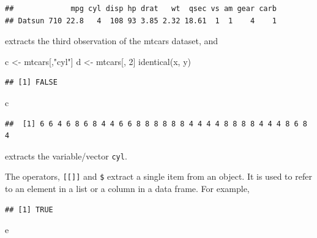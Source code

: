 \documentclass[
  12pt,
  oneside]{book}
\newenvironment{Shaded}{\begin{snugshade}}{\end{snugshade}}
\newcommand{\DecValTok}[1]{\textcolor[rgb]{0.00,0.00,0.81}{#1}}
\newcommand{\FunctionTok}[1]{\textcolor[rgb]{0.00,0.00,0.00}{#1}}
\newcommand{\NormalTok}[1]{#1}
\newcommand{\OtherTok}[1]{\textcolor[rgb]{0.56,0.35,0.01}{#1}}
\newcommand{\SpecialCharTok}[1]{\textcolor[rgb]{0.00,0.00,0.00}{#1}}
\newcommand{\StringTok}[1]{\textcolor[rgb]{0.31,0.60,0.02}{#1}}
\theoremstyle{definition}
\theoremstyle{definition}
\theoremstyle{definition}
\theoremstyle{definition}
\theoremstyle{remark}
\begin{document}
\begin{verbatim}
##             mpg cyl disp hp drat   wt  qsec vs am gear carb
## Datsun 710 22.8   4  108 93 3.85 2.32 18.61  1  1    4    1
\end{verbatim}

extracts the third observation of the mtcars dataset, and

\begin{Shaded}
\begin{Highlighting}[]
\NormalTok{c }\OtherTok{\textless{}{-}}\NormalTok{ mtcars[,}\StringTok{"cyl"}\NormalTok{]}
\NormalTok{d }\OtherTok{\textless{}{-}}\NormalTok{ mtcars[, }\DecValTok{2}\NormalTok{]}
\FunctionTok{identical}\NormalTok{(x, y)}
\end{Highlighting}
\end{Shaded}

\begin{verbatim}
## [1] FALSE
\end{verbatim}

\begin{Shaded}
\begin{Highlighting}[]
\NormalTok{c}
\end{Highlighting}
\end{Shaded}

\begin{verbatim}
##  [1] 6 6 4 6 8 6 8 4 4 6 6 8 8 8 8 8 8 4 4 4 4 8 8 8 8 4 4 4 8 6 8 4
\end{verbatim}

extracts the variable/vector \texttt{cyl}.

The operators, \texttt{{[}{[}{]}{]}} and \texttt{\$} extract a single item from an object. It is used to refer to an element in a list or a column in a data frame. For example,

\begin{Shaded}
\end{Shaded}

\begin{verbatim}
## [1] TRUE
\end{verbatim}

\begin{Shaded}
\begin{Highlighting}[]
\NormalTok{e}
\end{Highlighting}
\end{Shaded}
\end{document}
